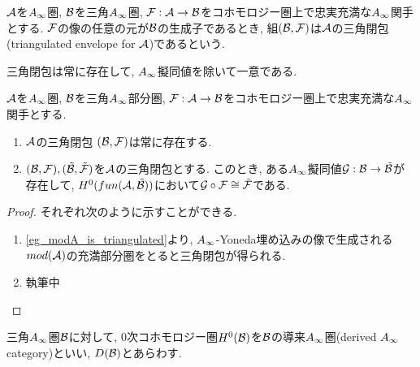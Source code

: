 \documentclass[uplatex, a4paper, 14Q, dvipdfmx]{jsarticle}
\begin{document}
\begin{definition}[三角閉包]
  $\mathcal{A}$を$\Ainf$圏, $\mathcal{B}$を三角$\Ainf$圏, $\mathcal{F} : \mathcal{A} \to \mathcal{B}$をコホモロジー圏上で忠実充満な$\Ainf$関手とする. 
  $\mathcal{F}$の像の任意の元が$\mathcal{B}$の生成子であるとき, 組$(\mathcal{B},\mathcal{F})$は$\mathcal{A}$の三角閉包 (triangulated envelope for $\mathcal{A}$)であるという. 
\end{definition}

三角閉包は常に存在して, $\Ainf$擬同値を除いて一意である. 

\begin{lemma} \label{prop_triangulated_envelope_si_always_exist}
  $\mathcal{A}$を$\Ainf$圏, $\mathcal{B}$を三角$\Ainf$部分圏, $\mathcal{F} : \mathcal{A} \to \mathcal{B}$をコホモロジー圏上で忠実充満な$\Ainf$関手とする. 
  \begin{enumerate}
    \item $\mathcal{A}$の三角閉包 $(\mathcal{B},\mathcal{F})$は常に存在する. 
    \item $(\mathcal{B},\mathcal{F}), (\tilde{\mathcal{B}},\tilde{\mathcal{F}})$を$\mathcal{A}$の三角閉包とする. 
    このとき, ある$\Ainf$擬同値$\mathcal{G} : \mathcal{B} \to \tilde{\mathcal{B}}$が存在して, $H^0(fun (\mathcal{A}, \tilde{\mathcal{B}}))$において$\mathcal{G} \circ \mathcal{F} \cong \tilde{\mathcal{F}}$である. 
  \end{enumerate}
\end{lemma}

\begin{proof}
  それぞれ次のように示すことができる.
  \begin{enumerate}
    \item \cref{eg_modA_is_triangulated}より, $\Ainf$-Yoneda埋め込みの像で生成される$mod (\mathcal{A})$の充満部分圏をとると三角閉包が得られる. 
    \item 執筆中
  \end{enumerate}
\end{proof}

\begin{definition}[導来$\Ainf$圏]
  三角$\Ainf$圏$\mathcal{B}$に対して, $0$次コホモロジー圏$H^0(\mathcal{B})$を$\mathcal{B}$の導来$\Ainf$圏(derived $\Ainf$ category)といい, $D(\mathcal{B})$とあらわす.
\end{definition}




\end{document}
